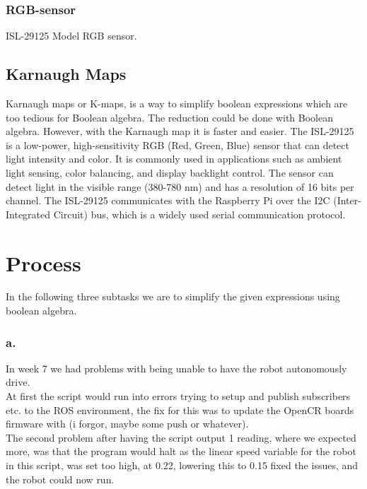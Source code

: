 \documentclass{article}
\begin{document}
\subsubsection*{RGB-sensor}
ISL-29125 Model RGB sensor.\\

\subsection*{Karnaugh Maps}
Karnaugh maps or K-maps, is a way to simplify boolean expressions which are too tedious for Boolean algebra. The reduction could be
done with Boolean algebra. However, with the Karnaugh map it is faster and easier.
The ISL-29125 is a low-power, high-sensitivity RGB (Red, Green, Blue) sensor that can detect light intensity and color.
It is commonly used in applications such as ambient light sensing, color balancing, and display backlight control.
The sensor can detect light in the visible range (380-780 nm) and has a resolution of 16 bits per channel.
The ISL-29125 communicates with the Raspberry Pi over the I2C (Inter-Integrated Circuit) bus, which is a widely used serial communication protocol.
\pagebreak

 \addtocounter{section}{1}
\section*{Process}
\noindent In the following three subtasks we are to simplify the given expressions using boolean algebra.
\subsubsection*{a.} 
In week 7 we had problems with being unable to have the robot autonomously drive.\\
At first the script would run into errors trying to setup and publish subscribers etc. to the ROS environment,
the fix for this was to update the OpenCR boards firmware with (i forgor, maybe some push or whatever).\\
The second problem after having the script output 1 reading, where we expected more, was that the program would
halt as the linear speed variable for the robot in this script, was set too high, at 0.22, lowering this to 0.15
fixed the issues, and the robot could now run.
\end{document}
